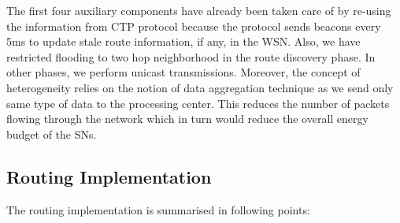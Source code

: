 \begin{enumerate}
        The first four auxiliary components have already been taken care of by re-using the information from \ac{CTP} protocol because the protocol sends beacons every 5ms to update stale route information, if any, in the \ac{WSN}. Also, we have restricted flooding to two hop neighborhood in the route discovery phase. In other phases, we perform unicast transmissions. Moreover, the concept of heterogeneity relies on the notion of data aggregation technique as we send only same type of data to the processing center. This reduces the number of packets flowing through the network which in turn would reduce the overall energy budget of the \acp{SN}.
    
        
    \end{enumerate}
    
    
    \subsection{Routing Implementation}
    
    The routing implementation is summarised in following points: 
    
